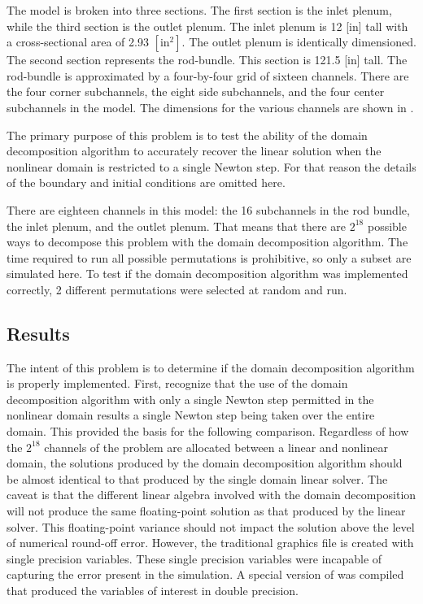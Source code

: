 The \cobra{} model is broken into three sections.
The first section is the inlet plenum, while the third section is the outlet plenum.
The inlet plenum is 12 [in] tall with a cross-sectional area of 2.93 $[ \text{in}^2]$.
The outlet plenum is identically dimensioned.
The second section represents the rod-bundle.
This section is 121.5 [in] tall.
The rod-bundle is approximated by a four-by-four grid of sixteen channels.
There are the four corner subchannels, the eight side subchannels, and the four center subchannels in the model.
The dimensions for the various channels are shown in .

The primary purpose of this problem is to test the ability of the domain decomposition algorithm to accurately recover the linear solution when the nonlinear domain is restricted to a single Newton step.
For that reason the details of the boundary and initial conditions are omitted here.

There are eighteen channels in this model: the 16 subchannels in the rod bundle, the inlet plenum, and the outlet plenum.
That means that there are $2^{18}$ possible ways to decompose this problem with the domain decomposition algorithm.
The time required to run all possible permutations is prohibitive, so only a subset are simulated here.
To test if the domain decomposition algorithm was implemented correctly, 2 different permutations were selected at random and run.

\subsection{Results}
\label{sect:complexResults}

The intent of this problem is to determine if the domain decomposition algorithm is properly implemented.
First, recognize that the use of the domain decomposition algorithm with only a single Newton step permitted in the nonlinear domain results a single Newton step being taken over the entire domain.
This provided the basis for the following comparison.
Regardless of how the $2^{18}$ channels of the problem are allocated between a linear and nonlinear domain, the solutions produced by the domain decomposition algorithm should be almost identical to that produced by the single domain linear solver.
The caveat is that the different linear algebra involved with the domain decomposition will not produce the same floating-point solution as that produced by the linear solver.
This floating-point variance should not impact the solution above the level of numerical round-off error.
However, the traditional \cobra{} graphics file is created with single precision variables.
These single precision variables were incapable of capturing the error present in the simulation.
A special version of \cobra{} was compiled that produced the variables of interest in double precision.

